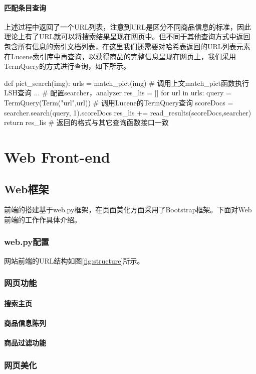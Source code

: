 \subsection{匹配条目查询}

上述过程中返回了一个URL列表，注意到URL是区分不同商品信息的标准，因此理论上有了URL就可以将搜索结果呈现在网页中。但不同于其他查询方式中返回包含所有信息的索引文档列表，在这里我们还需要对哈希表返回的URL列表元素在Lucene索引库中再查询，以获得商品的完整信息呈现在网页上，我们采用TermQuery的方式进行查询，如下所示。

\begin{python}
def pict_search(img):
    urls = match_pict(img)             # 调用上文match_pict函数执行LSH查询
    ... # 配置searcher，analyzer
    res_lis = []
    for url in urls:
        query = TermQuery(Term("url",url))   # 调用Lucene的TermQuery查询
        scoreDocs = searcher.search(query, 1).scoreDocs
        res_lis += read_results(scoreDocs,searcher)
    return res_lis                     # 返回的格式与其它查询函数接口一致
\end{python}


\part{Web Front-end}

\chapter{Web框架}

前端的搭建基于web.py框架，在页面美化方面采用了Bootstrap框架。下面对Web前端的工作作具体介绍。

\section{web.py配置}

网站前端的URL结构如图\ref{fig:structure}所示。

\section{网页功能}

\subsection{搜索主页}

\subsection{商品信息陈列}

\subsection{商品过滤功能}

\section{网页美化}
